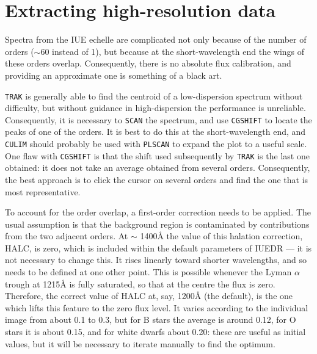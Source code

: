 \section{Extracting high-resolution data}

Spectra from the IUE echelle are complicated not only because of the number
of orders ($\sim 60$ instead of 1), but because at the short-wavelength end
the wings of these orders overlap. Consequently, there is no absolute flux
calibration, and providing an approximate one is something of a black art. 

{\tt TRAK} is generally able to find the centroid of a low-dispersion 
spectrum without difficulty, but without guidance in high-dispersion the 
performance is unreliable. Consequently, it is necessary to {\tt SCAN} the
spectrum, and use {\tt CGSHIFT} to locate the peaks of one of the 
orders. It is best to do this at the short-wavelength end, and {\tt CULIM}
should probably be used with {\tt PLSCAN} to expand the plot to a useful scale. 
One flaw with {\tt CGSHIFT} is that the shift used subsequently by {\tt TRAK}
is the last one obtained: it does not take an average obtained from several 
orders. Consequently, the best approach is to click the cursor on several 
orders and find the one that is most representative. 

To account for the order overlap, a first-order correction needs to be applied. 
The usual assumption is that the background region is contaminated by 
contributions from the two adjacent orders. At $\sim$ 1400{\AA} the value of 
this halation correction, HALC, is zero, which is included within the default
parameters of IUEDR --- it is not necessary to change this. 
It rises linearly toward shorter wavelengths, and so needs to 
be defined at one other point. 
This is possible whenever the Lyman $\alpha$ trough at 1215{\AA} 
is fully saturated, so that at the centre the flux is zero. Therefore, the
correct value of HALC at, say, 1200{\AA} (the default), is the one which 
lifts this feature to the zero flux level. It varies according to the 
individual image from about 0.1 to 0.3, but for B stars the average is 
around 0.12, for O stars it is about 0.15, and for white dwarfs about 0.20:
these are useful as initial values, but it will be necessary to iterate 
manually to find the optimum.

